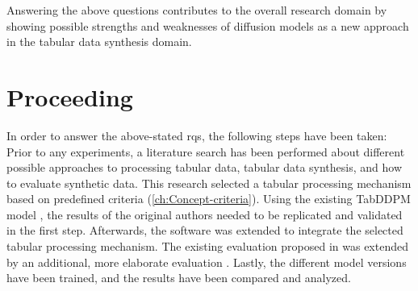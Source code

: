 Answering the above questions contributes to the overall research domain by showing possible strengths and weaknesses of diffusion models
as a new approach in the tabular data synthesis domain.

\section{Proceeding}
\label{ch:intro-proceeding}
In order to answer the above-stated \glspl{rq}, the following steps have been taken:
Prior to any experiments, a literature search has been performed about different possible approaches to processing tabular data, tabular data synthesis, and how to evaluate synthetic data.
This research selected a tabular processing mechanism based on predefined criteria (\autoref{ch:Concept-criteria}).
Using the existing TabDDPM model \cite{kotelnikov2022TabDDPMModellingTabular}, the results of the original authors needed to be replicated and validated in the first step.
Afterwards, the software was extended to integrate the selected tabular processing mechanism.
The existing evaluation proposed in \cite{kotelnikov2022TabDDPMModellingTabular} was extended by an additional, more elaborate evaluation \cite{akim2023TabDDPMModellingTabular}.
Lastly, the different model versions have been trained, and the results have been compared and analyzed.

